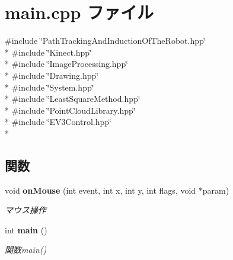\section{main.\-cpp ファイル}
\label{main_8cpp}
{\ttfamily \#include \char`\"{}Path\-Tracking\-And\-Induction\-Of\-The\-Robot.\-hpp\char`\"{}}\\*
{\ttfamily \#include \char`\"{}Kinect.\-hpp\char`\"{}}\\*
{\ttfamily \#include \char`\"{}Image\-Processing.\-hpp\char`\"{}}\\*
{\ttfamily \#include \char`\"{}Drawing.\-hpp\char`\"{}}\\*
{\ttfamily \#include \char`\"{}System.\-hpp\char`\"{}}\\*
{\ttfamily \#include \char`\"{}Least\-Square\-Method.\-hpp\char`\"{}}\\*
{\ttfamily \#include \char`\"{}Point\-Cloud\-Library.\-hpp\char`\"{}}\\*
{\ttfamily \#include \char`\"{}E\-V3\-Control.\-hpp\char`\"{}}\\*
\subsection*{関数}
\begin{DoxyCompactItemize}
\item 
void {\bf on\-Mouse} (int event, int x, int y, int flags, void $\ast$param)
\begin{DoxyCompactList}\small\item\em マウス操作 \end{DoxyCompactList}\item 
int {\bf main} ()
\begin{DoxyCompactList}\small\item\em 関数main() \end{DoxyCompactList}\end{DoxyCompactItemize}
